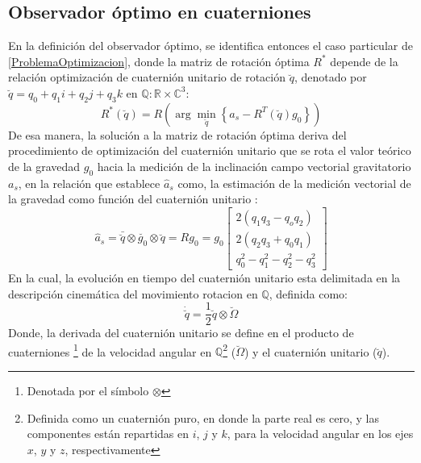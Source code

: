 \documentclass[conference]{IEEEtran}
\begin{document}
\subsection{Observador óptimo en cuaterniones}
En la definición del observador óptimo, se identifica entonces el caso particular de \ref{ProblemaOptimizacion}, donde la matriz de rotación óptima $R^*$ depende de la relación optimización de cuaternión unitario de rotación $\breve{q}$, denotado por $\breve{q}=q_0+q_1i+q_2j+q_3k$ en $\mathbb{Q}:\mathbb{R}\times\mathbb{C}^3$:
\begin{equation}\label{ProblemaOptimizacionAcc}
R^*(\breve{q})=R\left(\arg\min_{\breve{q}}\left\{a_s-R^T(\breve{q})g_0\right\}\right)
\end{equation} 
De esa manera, la solución a la matriz de rotación óptima deriva del procedimiento  de optimización del cuaternión unitario que se rota el valor teórico de la gravedad $g_0$ hacia la medición de la inclinación campo vectorial gravitatorio $a_s$, en la relación que establece $\hat{a}_s$ como, la estimación de la medición vectorial de la gravedad como función del cuaternión unitario \cite{Sola2012}:
\begin{equation}\label{chap2:ModeloMedicion}
\hat{a}_s=\bar{\breve{q}}\otimes\breve{g_0}\otimes\breve{q}=Rg_0=g_0\begin{bmatrix}2(q_1q_3-q_oq_2)\\2(q_2q_3+q_0q_1)\\q_0^2-q_1^2-q_2^2-q_3^2\end{bmatrix}
\end{equation}
En la cual, la evolución en tiempo del cuaternión unitario esta delimitada en la descripción cinemática del movimiento rotacion en $\mathbb{Q}$, definida como:
\begin{equation}
\dot{\breve{q}}=\frac{1}{2}\breve{q}\otimes\breve{\Omega}
\end{equation}
Donde, la derivada del cuaternión unitario se define en el producto de cuaterniones \footnote{Denotada por el símbolo $\otimes$} de la velocidad angular en $\mathbb{Q}$\footnote{Definida como un cuaternión puro, en donde la parte real es cero, y las componentes están repartidas en $i$, $j$ y $k$, para la velocidad angular en los ejes $x$, $y$ y $z$, respectivamente} ($\breve{\Omega}$) y el cuaternión unitario ($\breve{q}$).\par
\end{document}
